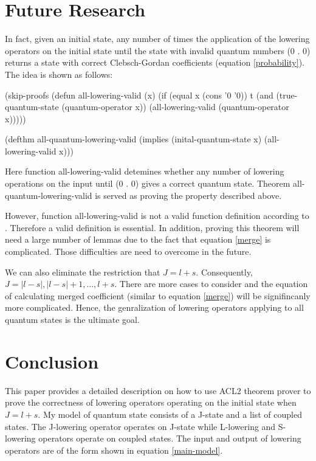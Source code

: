 \documentclass[12pt,journal,compsoc]{IEEEtran}
\begin{document}
\section{Future Research}

In fact, given an initial state, any number of times the application of the lowering operators on the initial state until the state with invalid quantum numbers (0 . 0) returns a state with correct Clebsch-Gordan coefficients (equation \ref{probability}). The idea is shown as follows:

\begin{acl2-lst}
(skip-proofs
 (defun all-lowering-valid (x)
  (if (equal x (cons '0 '0))
   t
   (and (true-quantum-state 
	 (quantum-operator x))
    (all-lowering-valid 
     (quantum-operator x)))))

(defthm all-quantum-lowering-valid 
	(implies (inital-quantum-state x)
		 (all-lowering-valid x)))

\end{acl2-lst}

Here function all-lowering-valid detemines whether any number of lowering operations on the input until (0 . 0) gives a correct quantum state. Theorem all-quantum-lowering-valid is served as proving the property described above.

However, function all-lowering-valid is not a valid function definition according to \cite{acl2}. Therefore a valid definition is essential. In addition, proving this theorem will need a large number of lemmas due to the fact that equation \ref{merge} is complicated. Those difficulties are need to overcome in the future.

We can also eliminate the restriction that $J=l+s$. Consequently, $J=|l-s|,|l-s|+1,\ldots ,l+s$. There are more cases to consider and the equation of calculating merged coefficient (similar to equation \ref{merge}) will be signifincanly more complicated. Hence, the genralization of lowering operators applying to all quantum states is the ultimate goal.

\section{Conclusion}

This paper provides a detailed description on how to use ACL2 theorem prover to prove the correctness of lowering operators operating on the initial state when $J=l+s$. My model of quantum state consists of a J-state and a list of coupled states. The J-lowering operator operates on J-state while L-lowering and S-lowering operators operate on coupled states. The input and output of lowering operators are of the form shown in equation \ref{main-model}. 
\end{document}
